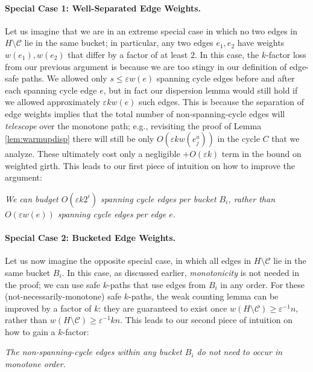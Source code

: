 \documentclass{theoretics}
\newcommand{\eps}{\varepsilon}
\newcommand{\cee}{\mathcal{C}}
\begin{document}
\paragraph{Special Case 1: Well-Separated Edge Weights.} Let us imagine that we are in an extreme special case in which no two edges in $H \setminus \cee$ lie in the same bucket; in particular, any two edges $e_1, e_2$ have weights $w(e_1), w(e_2)$ that differ by a factor of at least $2$.
In this case, the $k$-factor loss from our previous argument is because we are too stingy in our definition of edge-safe paths.
We allowed only $s \le \eps w(e)$ spanning cycle edges before and after each spanning cycle edge $e$, but in fact our dispersion lemma would still hold if we allowed approximately $\eps k w(e)$ such edges.
This is because the separation of edge weights implies that the total number of non-spanning-cycle edges will \emph{telescope} over the monotone path; e.g., revisiting the proof of Lemma \ref{lem:warmupdisp} there will still be only $O(\eps k w(e_j^a))$ in the cycle $C$ that we analyze.
These ultimately cost only a negligible $+O(\eps k)$ term in the bound on weighted girth.
This leads to our first piece of intuition on how to improve the argument:

\begin{center}
\emph{We can budget $O(\eps k 2^i)$ spanning cycle edges per bucket $B_i$, rather than $O(\eps w(e))$ spanning cycle edges per edge $e$.}
\end{center}

\paragraph{Special Case 2: Bucketed Edge Weights.} Let us now imagine the opposite special case, in which all edges in $H \setminus \cee$ lie in the same bucket $B_i$.
In this case, as discussed earlier, \emph{monotonicity} is not needed in the proof; we can use safe $k$-paths that use edges from $B_i$ in any order.
For these (not-necessarily-monotone) safe $k$-paths, the weak counting lemma can be improved by a factor of $k$: they are guaranteed to exist once $w(H \setminus \cee) \ge \eps^{-1} n$, rather than $w(H \setminus \cee) \ge \eps^{-1} kn$.
This leads to our second piece of intuition on how to gain a $k$-factor:
\begin{center}
\emph{The non-spanning-cycle edges within any bucket $B_i$ do not need to occur in monotone order.}
\end{center}
\end{document}
